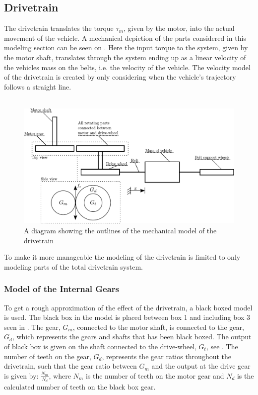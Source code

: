 \subsection{Drivetrain}\label{DriveTrain}
The drivetrain translates the torque $\tau_m$, given by the motor, into the actual movement of the vehicle. A mechanical depiction of the parts considered in this modeling section can be seen on . Here the input torque to the system, given by the motor shaft, translates through the system ending up as a linear velocity of the vehicles mass on the belts, i.e. the velocity of the vehicle. The velocity model of the drivetrain is created by only considering when the vehicle's trajectory follows a straight line.\\\\

\begin{figure}[H]
	\centering
	\includegraphics[scale=0.8]{figures/mechanicalDrawingSystem.pdf}
	\caption{A diagram showing the outlines of the mechanical model of the drivetrain}
	\label{fig:DrivetrainMechanicalModel}
\end{figure}

To make it more manageable the modeling of the drivetrain is limited to only modeling parts of the total drivetrain system.

\subsubsection{Model of the Internal Gears}\label{BlackBoxModel}
To get a rough approximation of the effect of the drivetrain, a black boxed model is used. The black box in the model is placed between box 1 and including box 3 seen in . The gear, $G_m$, connected to the motor shaft, is connected to the gear, $G_d$, which represents the gears and shafts that has been black boxed. The output of black box is given on the shaft connected to the drive-wheel, $G_t$, see . The number of teeth on the gear, $G_d$, represents the gear ratios throughout the drivetrain, such that the gear ratio between $G_m$ and the output at the drive gear is given by: $\frac{N_m}{N_d}$, where $N_m$ is the number of teeth on the motor gear and $N_d$ is the calculated number of teeth on the black box gear.

